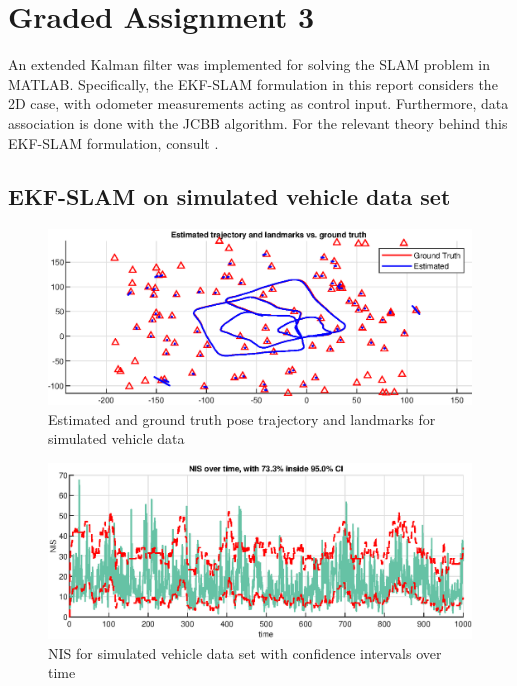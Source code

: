 \section{Graded Assignment 3}\label{sec:graded_assignment_3}



An extended Kalman filter was implemented for solving the SLAM problem in MATLAB. Specifically, the EKF-SLAM formulation in this report considers the 2D case, with odometer measurements acting as control input. Furthermore, data association is done with the JCBB algorithm. For the relevant theory behind this EKF-SLAM formulation, consult \cite[p. 185 - 196]{Edmund}.

\subsection{EKF-SLAM on simulated vehicle data set}

\begin{figure}[!htb]
    \centering
    \includegraphics[width=0.8\linewidth]{figures/ga_3/sim_trajectory.eps}
    \caption{Estimated and ground truth pose trajectory and landmarks for simulated vehicle data}
    \label{fig:ga_3_sim_trajectory}
\end{figure}

\begin{figure}[!htb]
    \centering
    \includegraphics[width=0.8\linewidth]{figures/ga_3/sim_NIS.eps}
    \caption{NIS for simulated vehicle data set with confidence intervals over time}
    \label{fig:ga_3_sim_NIS}
\end{figure}

